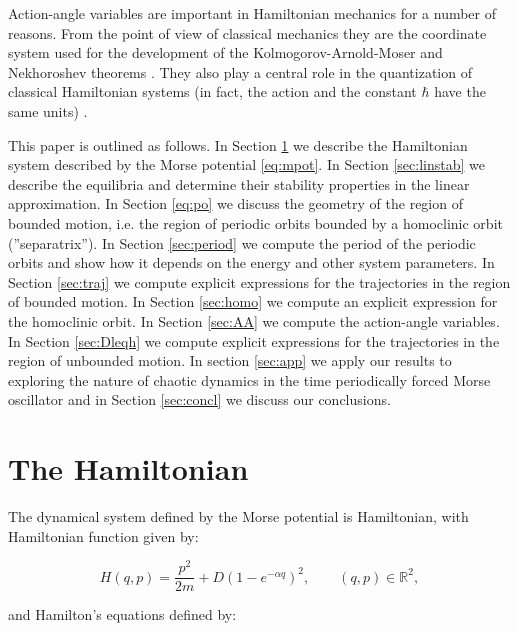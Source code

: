 \documentclass{ws-ijbc}
\begin{document}
 
 Action-angle variables are important in Hamiltonian mechanics for a number of reasons. From the point of view of classical mechanics they are the coordinate system used for the development of the Kolmogorov-Arnold-Moser and Nekhoroshev theorems \cite{dumas2014kam}.
They also play a central role in the quantization of classical Hamiltonian systems (in fact, the action and the constant $\hbar$ have the same units) \cite{stone2005einstein, keller1958corrected, keller1960asymptotic, keller1985semiclassical}. 

This paper is outlined as follows. In Section \ref{sec: Ham} we describe the Hamiltonian system described by the Morse potential \eqref{eq:mpot}. In Section \ref{sec:linstab} we describe the equilibria and determine their stability properties in the linear approximation. In Section \ref{eq:po} we discuss the geometry of the region of bounded motion, i.e. the region of periodic orbits bounded by a homoclinic orbit (''separatrix''). In Section \ref{sec:period} we compute the period of the periodic orbits and show how it depends on the energy and other system parameters. In Section \ref{sec:traj} we compute explicit expressions for the trajectories in the region of bounded motion. In Section \ref{sec:homo} we compute an explicit expression for the homoclinic  orbit. In Section \ref{sec:AA} we compute the action-angle variables. In Section \ref{sec:Dleqh} we compute explicit expressions for the trajectories in the region of unbounded motion. In section \ref{sec:app} we apply our results to exploring the nature of chaotic dynamics in the time periodically forced Morse oscillator  and in Section \ref{sec:concl} we discuss our conclusions.








\section{The Hamiltonian}
\label{sec: Ham}

The dynamical system defined by the Morse potential is Hamiltonian, with Hamiltonian function given by:

\begin{equation}
H (q, p) = \frac{p^2}{2m} + D \left( 1-e^{-\alpha q} \right)^2, \qquad (q, p) \in \mathbb{R}^2,
\label{eq:ham}
\end{equation}

\noindent
and Hamilton's equations defined by:
\end{document}
